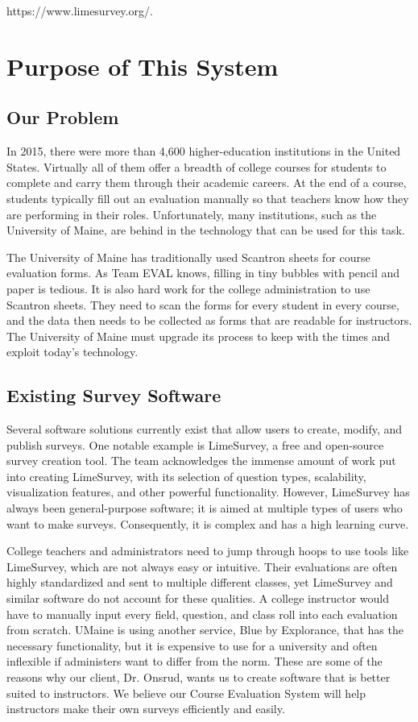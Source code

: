 \documentclass{article}
\begin{document}
https://www.limesurvey.org/.

\section{Purpose of This System}

\subsection{Our Problem}

In 2015, there were more than 4,600 higher-education institutions in the United States. Virtually all of them offer a breadth of college courses for students to complete and carry them through their academic careers. At the end of a course, students typically fill out an evaluation manually so that teachers know how they are performing in their roles. Unfortunately, many institutions, such as the University of Maine, are behind in the technology that can be used for this task.

The University of Maine has traditionally used Scantron sheets for course evaluation forms. As Team EVAL knows, filling in tiny bubbles with pencil and paper is tedious. It is also hard work for the college administration to use Scantron sheets. They need to scan the forms for every student in every course, and the data then needs to be collected as forms that are readable for instructors. The University of Maine must upgrade its process to keep with the times and exploit today's technology.

\subsection{Existing Survey Software}

Several software solutions currently exist that allow users to create, modify, and publish surveys. One notable example is LimeSurvey, a free and open-source survey creation tool. The team acknowledges the immense amount of work put into creating LimeSurvey, with its selection of question types, scalability, visualization features, and other powerful functionality. However, LimeSurvey has always been general-purpose software; it is aimed at multiple types of users who want to make surveys. Consequently, it is complex and has a high learning curve.

College teachers and administrators need to jump through hoops to use tools like LimeSurvey, which are not always easy or intuitive. Their evaluations are often highly standardized and sent to multiple different classes, yet LimeSurvey and similar software do not account for these qualities. A college instructor would have to manually input every field, question, and class roll into each evaluation from scratch. UMaine is using another service, Blue by Explorance, that has the necessary functionality, but it is expensive to use for a university and often inflexible if administers want to differ from the norm. These are some of the reasons why our client, Dr. Onsrud, wants us to create software that is better suited to instructors. We believe our Course Evaluation System will help instructors make their own surveys efficiently and easily. 
\end{document}
